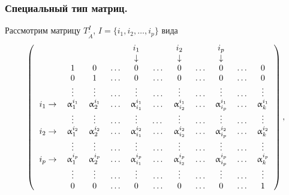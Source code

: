 \begin{frame}
\frametitle{Специальный тип матриц.}
Рассмотрим матрицу $T^I_{\widetilde{A}}$, $I=\{i_1,i_2,\ldots,i_p\}$ вида
\begin{equation*}
\left(\begin{tabular}{ccccccccccc}
&               &         &       &$i_1$        &       &$i_2$       &      &$i_p$       &      &\\
&               &         &       &$\downarrow$ &       &$\downarrow$&      &$\downarrow$&       &\\
&1              &0        &$\ldots$ &0          &$\ldots$ &0         &$\ldots$&0         &$\ldots$&0\\
&0              &1        &$\ldots$ &0          &$\ldots$ &0         &$\ldots$&0         &$\ldots$&0\\
&$\vdots$         &$\vdots$   &$\ldots$ &$\vdots$     &$\ldots$ &$\vdots$    &$\ldots$&$\vdots$    &$\ldots$&$\vdots$     \\
$i_1 \rightarrow$ &$\alpha^{i_1}_1$ &$\alpha^{i_1}_2$ &$\ldots$ &$\alpha^{i_1}_{i_1}$&$\ldots$&$\alpha^{i_1}_{i_2}$&$\ldots$ &$\alpha^{i_1}_{i_p}$&$\ldots$ &$\alpha^{i_1}_{k}$ \\
               &$\vdots$   &$\vdots$   &$\ldots$ &$\vdots$&\ldots&$\vdots$     &$\ldots$ &$\vdots$&$\ldots$ &$\vdots$     \\
$i_2\rightarrow$ &$\alpha^{i_2}_1$ &$\alpha^{i_2}_2$ &$\ldots$ &$\alpha^{i_2}_{i_1}$&$\ldots$ &$\alpha^{i_2}_{i_2}$&$\ldots$ &$\alpha^{i_2}_{i_p}$        &$\ldots$ &$\alpha^{i_2}_{k}$ \\
               &$\vdots$   &$\vdots$   &$\ldots$ &$\vdots$&$\ldots$ &$\vdots$&$\ldots$ &$\vdots$      &$\ldots$ &$\vdots$     \\
$i_p\rightarrow$ &$\alpha^{i_p}_1$ &$\alpha^{i_p}_2$ &$\ldots$ &$\alpha^{i_p}_{i_1}$&$\ldots$ &$\alpha^{i_p}_{i_2}$  &$\ldots$ &$\alpha^{i_p}_{i_p}$      &$\ldots$ &$\alpha^{i_p}_{k}$ \\
               &$\vdots$   &$\vdots$   &$\ldots$ &$\vdots$ &$\ldots$ &$\vdots$&$\ldots$ &$\vdots$        &$\ldots$ &$\vdots$     \\
               &0        &0        &$\ldots$ &0 &$\ldots$ &0     &$\ldots$ &0     &$\ldots$ &1          \\
\end{tabular}\right),
\end{equation*}
\end{frame}

